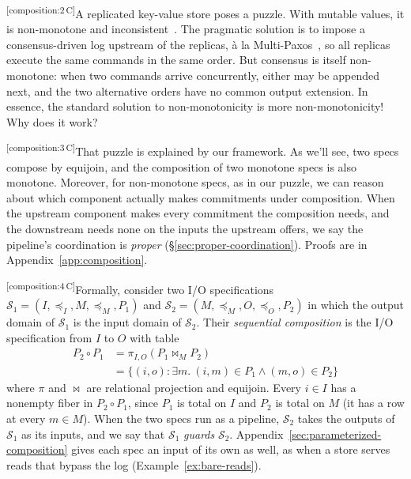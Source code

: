 \documentclass[sigconf]{cidr-2027}
\theoremstyle{remark}
\newcommand{\InputOrd}{\preceq_I}
\newcommand{\OutputOrd}{\preceq_O}
\newcommand{\commitment}{commitment\xspace}
\newcommand{\commitments}{commitments\xspace}
\newcommand{\outnoun}{output extension\xspace}%
\newcommand{\Spec}{\mathcal{S}}
\newcommand{\spectype}[1][]{I/O specification#1\xspace}
\newcommand{\cxtag}[2]{\textsuperscript{\textsf{\tiny[#1\,#2]}}}
\begin{document}
\color{black!45}\cxtag{composition:2}{C}A replicated key-value store poses a puzzle.  With mutable values, it is
non-monotone and inconsistent~\cite{alvaro2011bloom}. The pragmatic solution is
to impose a consensus-driven log upstream of the replicas, \`a la
Multi-Paxos~\cite{lamport2001paxos}, so all replicas execute the same commands
in the same order. But consensus is itself non-monotone: when two commands
arrive concurrently, either may be appended next, and the two alternative orders
have no common \outnoun.  In essence, the standard solution to non-monotonicity
is more non-monotonicity! Why does it work?\color{black}

\color{black!45}\cxtag{composition:3}{C}That puzzle is explained by our framework.  As we'll see, two specs compose by equijoin,
and the composition of two monotone specs is also monotone. Moreover, for non-monotone specs,
as in our puzzle, we
can reason about which component actually makes \commitments under composition.  When the
upstream component makes every \commitment the composition needs, and the
downstream needs none on the inputs the upstream offers, we say the pipeline's
coordination is \emph{proper}
(\S\ref{sec:proper-coordination}).  Proofs are in
Appendix~\ref{app:composition}.\color{black}
\label{sec:sequential-composition}

\color{black!45}\cxtag{composition:4}{C}Formally, consider two \spectype[s]
${\Spec_1=(I,\InputOrd,M,\preceq_M,P_1)}$ and
${\Spec_2=(M,\preceq_M,O,\OutputOrd,P_2)}$
in which the output domain of $\Spec_1$ is the input domain of $\Spec_2$.  Their
\emph{sequential composition} is the \spectype from $I$ to $O$ with table
\begin{equation}
\begin{split}
  P_2\circ P_1
  &=\pi_{I,O}(P_1\Join_M P_2)\\
  &=\{(i,o):\exists m.\ (i,m)\in P_1\land(m,o)\in P_2\}
\end{split}
  \label{eq:spec-composition}
\end{equation}
where $\pi$ and $\Join$ are relational projection and equijoin.  Every $i\in I$
has a nonempty fiber in $P_2\circ P_1$, since $P_1$ is total on $I$ and $P_2$ is
total on $M$ (it has a row at every $m\in M$).  When the two specs run as a
pipeline, $\Spec_2$ takes the outputs of $\Spec_1$ as its inputs, and
we say that $\Spec_1$ \emph{guards} $\Spec_2$.
Appendix~\ref{sec:parameterized-composition} gives each spec an input of its
own as well, as when a store serves reads that bypass the log
(Example~\ref{ex:bare-reads}).\color{black}
\end{document}
